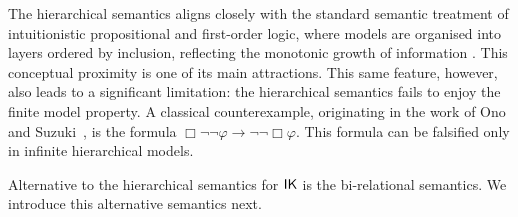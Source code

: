 The hierarchical semantics aligns closely with the standard semantic treatment of intuitionistic propositional and first-order logic, where models are organised into layers ordered by inclusion, reflecting the monotonic growth of information \cite{Troelstra1988}. This conceptual proximity is one of its main attractions. This same feature, however, also leads to a significant limitation: the hierarchical semantics fails to enjoy the finite model property. A classical counterexample, originating in the work of Ono and Suzuki~\cite{ono1988}, is the formula $\Box \neg \neg \varphi \to \neg \neg \Box \varphi$. This formula can be falsified only in infinite hierarchical models.

Alternative to the hierarchical semantics for $\mathsf{IK}$ is the bi-relational semantics. We introduce this alternative semantics next.

